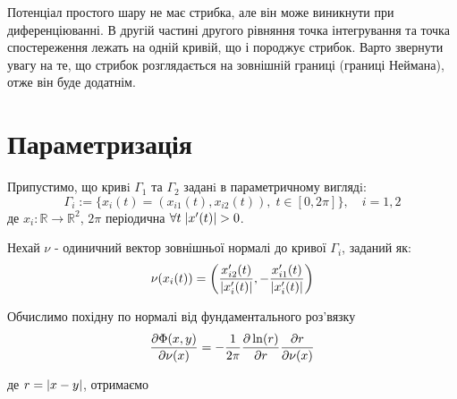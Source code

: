 \documentclass[14pt,a4paper]{extarticle}
\newcounter{e}
\numberwithin{equation}{section}
\numberwithin{figure}{section}
\newcommand{\intl}{\int\limits}
\begin{document}
 Потенціал простого шару не має стрибка, але він може виникнути при диференціюванні. В другій частині другого рівняння точка інтегрування та точка спостереження лежать на одній кривій, що і породжує стрибок. Варто звернути увагу на те, що стрибок розглядається на зовнішній границі (границі Неймана), отже він буде додатнім.
 

  
 \newpage
 \thispagestyle{empty}
 \section{Параметризація}

 Припустимо, що кривi $\Gamma_{1}$ та $\Gamma_{2}$ заданi в параметричному виглядi:
\begin{equation}
	\label{parametrization}
	 \Gamma_{i} := \{ x_{i}(t) = (x_{i1}(t), x_{i2}(t)), \; t \in [ 0, 2\pi ] \} , \quad i = 1, 2
\end{equation}
де $x_{i} : \mathbb{R} \rightarrow \mathbb{R}^2$, $2\pi$ періодична $\forall{t} \; \abs{x'(t)} > 0$.

Нехай $\nu$ - одиничний вектор зовнішньої нормалі до кривої $\Gamma_{i}$, заданий як:
\begin{equation}
	\nu(x_i(t)) = \left(
	\frac{
		x'_{i2}(t)}{\abs{x'_{i}(t)}
	},
	- \frac{
	x'_{i1}(t)}{\abs{x'_{i}(t)}}
	\right)
\end{equation}

Обчислимо похідну по нормалі від фундаментального роз'вязку
$$
\pdv{\Phi(x, y)}{\nu(x)} = -\frac{1}{2\pi} \pdv{\ln(r)}{r}\pdv{r}{\nu(x)}
$$

\indent де $r = \abs{x - y}$, отримаємо
\end{document}
